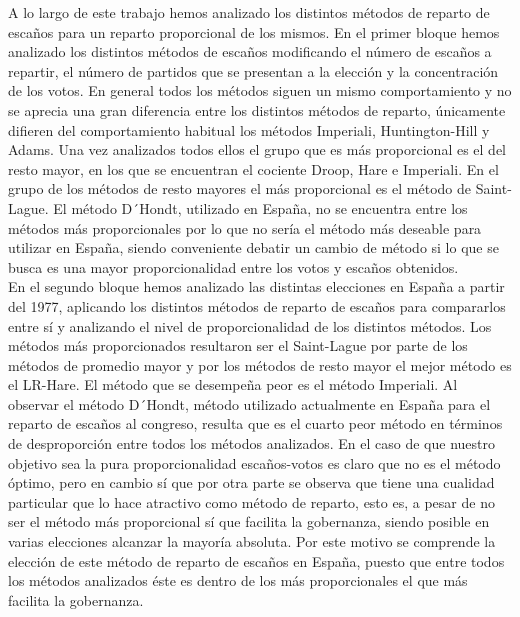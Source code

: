 \documentclass[12pt,a4paper,]{book}
\numberwithin{dummy}{section}
\theoremstyle{ocrenumbox}
\theoremstyle{blacknumex}
\theoremstyle{blacknumbox}
\theoremstyle{ocrenum}
\theoremstyle{ocrenum}
\begin{document}
A lo largo de este trabajo hemos analizado los distintos métodos de
reparto de escaños para un reparto proporcional de los mismos. En el
primer bloque hemos analizado los distintos métodos de escaños
modificando el número de escaños a repartir, el número de partidos que
se presentan a la elección y la concentración de los votos. En general
todos los métodos siguen un mismo comportamiento y no se aprecia una
gran diferencia entre los distintos métodos de reparto, únicamente
difieren del comportamiento habitual los métodos Imperiali,
Huntington-Hill y Adams. Una vez analizados todos ellos el grupo que es
más proporcional es el del resto mayor, en los que se encuentran el
cociente Droop, Hare e Imperiali. En el grupo de los métodos de resto
mayores el más proporcional es el método de Saint-Lague. El método
D´Hondt, utilizado en España, no se encuentra entre los métodos más
proporcionales por lo que no sería el método más deseable para utilizar
en España, siendo conveniente debatir un cambio de método si lo que se
busca es una mayor proporcionalidad entre los votos y escaños
obtenidos.\\
En el segundo bloque hemos analizado las distintas elecciones en España
a partir del 1977, aplicando los distintos métodos de reparto de escaños
para compararlos entre sí y analizando el nivel de proporcionalidad de
los distintos métodos. Los métodos más proporcionados resultaron ser el
Saint-Lague por parte de los métodos de promedio mayor y por los métodos
de resto mayor el mejor método es el LR-Hare. El método que se desempeña
peor es el método Imperiali. Al observar el método D´Hondt, método
utilizado actualmente en España para el reparto de escaños al congreso,
resulta que es el cuarto peor método en términos de desproporción entre
todos los métodos analizados. En el caso de que nuestro objetivo sea la
pura proporcionalidad escaños-votos es claro que no es el método óptimo,
pero en cambio sí que por otra parte se observa que tiene una cualidad
particular que lo hace atractivo como método de reparto, esto es, a
pesar de no ser el método más proporcional sí que facilita la
gobernanza, siendo posible en varias elecciones alcanzar la mayoría
absoluta. Por este motivo se comprende la elección de este método de
reparto de escaños en España, puesto que entre todos los métodos
analizados éste es dentro de los más proporcionales el que más facilita
la gobernanza.
\end{document}
